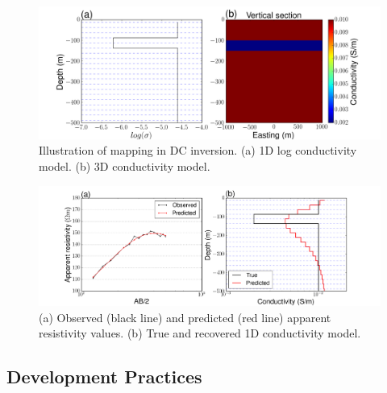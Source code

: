 \documentclass[preprint,review,3p,times,onecolumn,authoryear]{elsarticle}
\begin{document}
{%
\begin{figure}[ht!]
\centering
\includegraphics[width=16cm]{images/mappingDC.png}
\caption{Illustration of mapping in DC inversion. (a) 1D log conductivity model. (b) 3D conductivity model.}
\label{fig:DCmapping}
\end{figure}
\begin{figure}[ht!]
\centering
\includegraphics[width=16cm]{images/obspredDC.png}
\caption{(a) Observed (black line) and predicted (red line) apparent resistivity values. (b) True and recovered 1D conductivity model. }
\label{fig:DCinverse}
\end{figure}
}


\subsection{Development Practices}
\end{document}
